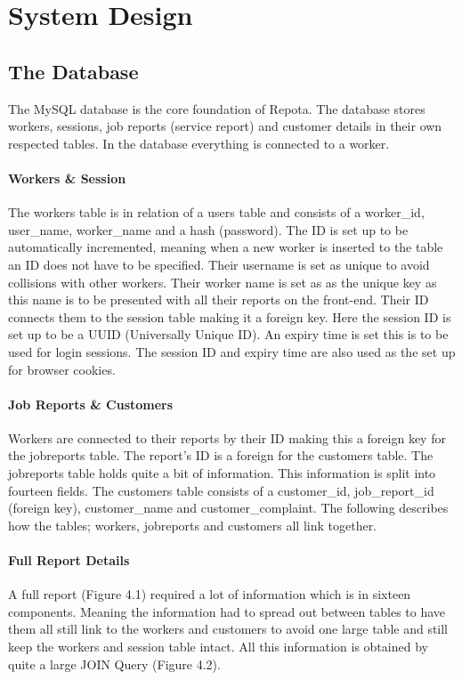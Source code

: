 \chapter{System Design}
\section{The Database}
The MySQL database is the core foundation of Repota. The database stores workers, sessions, job reports (service report) and customer details in their own respected tables. In the database everything is connected to a worker. 

\subsubsection{Workers \& Session}
The workers table is in relation of a users table and consists of a worker\_id, user\_name, worker\_name and a hash (password). The ID is set up to be automatically incremented, meaning when a new worker is inserted to the table an ID does not have to be specified. Their username is set as unique to avoid collisions with other workers. Their worker name is set as as the unique key as this name is to be presented with all their reports on the front-end. Their ID connects them to the session table making it a foreign key. Here the session ID is set up to be a UUID (Universally Unique ID). An expiry time is set this is to be used for login sessions. The session ID and expiry time are also used as the set up for browser cookies.

\subsubsection{Job Reports \& Customers}
Workers are connected to their reports by their ID making this a foreign key for the jobreports table. The report's ID is a foreign for the customers table. The jobreports table holds quite a bit of information. This information is split into fourteen fields. The customers table consists of a customer\_id, job\_report\_id (foreign key), customer\_name and customer\_complaint.  The following describes how the tables; workers, jobreports and customers all link together. 
 \newpage
\subsubsection{Full Report Details}
A full report (Figure 4.1) required a lot of information which is in sixteen components. Meaning the information had to spread out between tables to have them all still link to the workers and customers to avoid one large table and still keep the workers and session table intact. All this information is obtained by quite a large JOIN Query (Figure 4.2).

